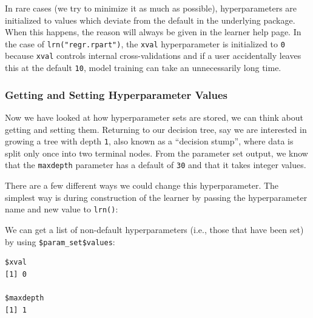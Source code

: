 In rare cases (we try to minimize it as much as possible),
hyperparameters are initialized to values which deviate from the default
in the underlying package. When this happens, the reason will always be
given in the learner help page. In the case of
\texttt{lrn("regr.rpart")}, the \texttt{xval} hyperparameter is
initialized to \texttt{0} because \texttt{xval} controls internal
cross-validations and if a user accidentally leaves this at the default
\texttt{10}, model training can take an unnecessarily long time.

\hypertarget{getting-and-setting-hyperparameter-values}{%
\subsubsection{Getting and Setting Hyperparameter
Values}\label{getting-and-setting-hyperparameter-values}}

Now we have looked at how hyperparameter sets are stored, we can think
about getting and setting them. Returning to our decision tree, say we
are interested in growing a tree with depth \texttt{1}, also known as a
``decision stump'', where data is split only once into two terminal
nodes. From the parameter set output, we know that the \texttt{maxdepth}
parameter has a default of \texttt{30} and that it takes integer values.

There are a few different ways we could change this hyperparameter. The
simplest way is during construction of the learner by passing the
hyperparameter name and new value to \texttt{lrn()}:

\begin{Shaded}
\begin{Highlighting}[]
\OtherTok{=} \NormalTok{(}\NormalTok{, } \NormalTok{)}
\end{Highlighting}
\end{Shaded}

We can get a list of non-default hyperparameters (i.e., those that have
been set) by using \texttt{\$param\_set\$values}:

\begin{Shaded}
\begin{Highlighting}[]
\SpecialCharTok{$}\SpecialCharTok{$}
\end{Highlighting}
\end{Shaded}

\begin{verbatim}
$xval
[1] 0

$maxdepth
[1] 1
\end{verbatim}

